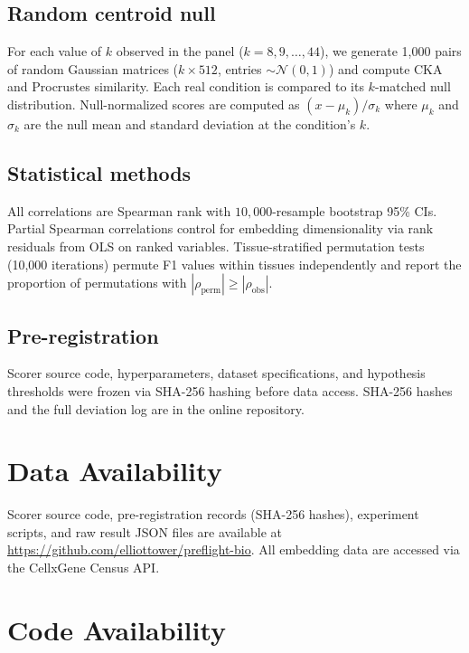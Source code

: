 \documentclass[11pt]{article}
\begin{document}
\subsection{Random centroid null}

For each value of $k$ observed in the panel ($k = 8, 9, \ldots, 44$),
we generate 1,000 pairs of random Gaussian matrices ($k \times 512$,
entries $\sim \mathcal{N}(0,1)$) and compute CKA and Procrustes
similarity. Each real condition is compared to its $k$-matched null
distribution. Null-normalized scores are computed as
$(x - \mu_k) / \sigma_k$ where $\mu_k$ and $\sigma_k$ are the null
mean and standard deviation at the condition's $k$.

\subsection{Statistical methods}

All correlations are Spearman rank with $10{,}000$-resample bootstrap
95\% CIs. Partial Spearman correlations control for embedding
dimensionality via rank residuals from OLS on ranked variables.
Tissue-stratified permutation tests (10,000 iterations) permute F1
values within tissues independently and report the proportion of
permutations with $|\rho_{\mathrm{perm}}| \geq |\rho_{\mathrm{obs}}|$.

\subsection{Pre-registration}

Scorer source code, hyperparameters, dataset specifications, and
hypothesis thresholds were frozen via SHA-256 hashing before data
access. SHA-256 hashes and the full deviation log are in the online
repository.


\section*{Data Availability}

Scorer source code, pre-registration records (SHA-256 hashes),
experiment scripts, and raw result JSON files are available at
\url{https://github.com/elliottower/preflight-bio}. All embedding data
are accessed via the CellxGene Census API.

\section*{Code Availability}
\end{document}
